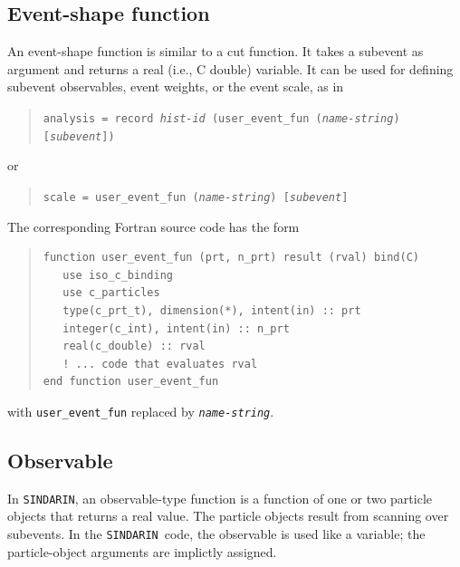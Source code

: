\documentclass[12pt]{book}
\newcommand{\ttt}[1]{\texttt{#1}}
\newcommand{\sindarin}{\texttt{SINDARIN}}
\begin{document}
\subsection{Event-shape function}

An event-shape function is similar to a cut function.  It takes a
subevent as argument and returns a real (i.e., C double) variable.  It
can be used for defining subevent observables, event weights, or the
event scale, as in
\begin{quote}
\begin{footnotesize}
  \ttt{analysis = record \emph{hist-id} (user\_event\_fun (\emph{name-string}) [\emph{subevent}])}
\end{footnotesize}
\end{quote}
or
\begin{quote}
\begin{footnotesize}
  \ttt{scale = user\_event\_fun (\emph{name-string}) [\emph{subevent}]}
\end{footnotesize}
\end{quote}
The corresponding Fortran source code has the form
\begin{quote}
\begin{footnotesize}
\begin{verbatim}
function user_event_fun (prt, n_prt) result (rval) bind(C)
   use iso_c_binding
   use c_particles
   type(c_prt_t), dimension(*), intent(in) :: prt
   integer(c_int), intent(in) :: n_prt
   real(c_double) :: rval
   ! ... code that evaluates rval
end function user_event_fun
\end{verbatim}
\end{footnotesize}
\end{quote}
with \ttt{user\_event\_fun} replaced by \ttt{\emph{name-string}}.

\subsection{Observable}

In \sindarin, an observable-type function is a function of one or two
particle objects that returns a real value.  The particle objects
result from scanning over subevents.  In the \sindarin\ code, the
observable is used like a variable; the particle-object arguments are
implictly assigned.
\end{document}
